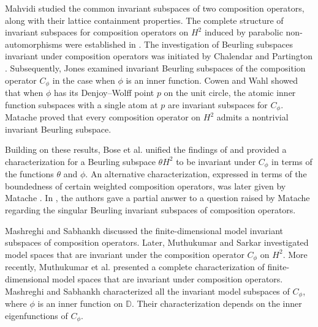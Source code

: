 \documentclass[12pt, reqno]{amsart}
\theoremstyle{definition}
\numberwithin{equation}{section}
\begin{document}
Mahvidi \cite{mahvidi} studied the common invariant subspaces of two composition operators, along with their lattice containment properties. The complete structure of invariant subspaces for composition operators on $H^2$ induced by parabolic non-automorphisms were established in \cite{parabolic}. The investigation of Beurling subspaces invariant under composition operators was initiated by Chalendar and Partington \cite{Chalendar}. Subsequently, Jones \cite{jones} examined invariant Beurling subspaces of the composition operator $C_\phi$ in the case when $\phi$ is an inner function. Cowen and Wahl \cite{cowen} showed that when $\phi$ has its Denjoy–Wolff point $p$ on the unit circle, the atomic inner function subspaces with a single atom at $p$ are invariant subspaces for $C_\phi$. Matache \cite{valentine} proved that every composition operator on $H^2$ admits a nontrivial invariant Beurling subspace.
 
 Building on these results, Bose et al. \cite{buerlingtype} unified the findings of \cite{cowen, jones, valentine} and provided a characterization for a Beurling subspace $\theta H^2$ to be invariant under $C_\phi$ in terms of the functions $\theta$ and $\phi$. An alternative characterization, expressed in terms of the boundedness of certain weighted composition operators, was later given by Matache \cite{smirnov}. In \cite{article1}, the authors gave a partial answer to a question raised by  Matache \cite{valentine} regarding the singular Beurling  invariant subspaces of composition operators. 
 
   Mashreghi and Sabhankh \cite{finiterank} discussed  the finite-dimensional model invariant subspaces of composition operators. Later, Muthukumar and Sarkar \cite{model} investigated model spaces that are invariant under the composition operator $C_\phi$ on $H^2$. More recently, Muthukumar et al. \cite{modelfinite} presented a complete characterization of finite-dimensional model spaces that are invariant under composition operators. Mashreghi and Sabhankh \cite{javad} characterized all the invariant model subspaces of $C_\phi$, where $\phi$ is an inner function on $\mathbb{D}$. Their characterization depends on the inner eigenfunctions of $C_\phi$.
\end{document}
